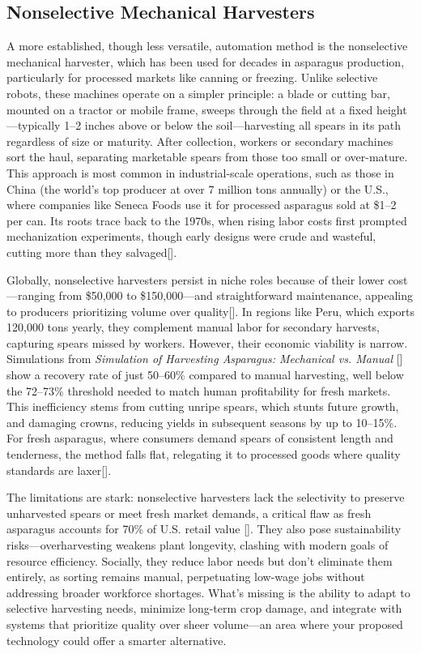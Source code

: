 \subsection{Nonselective Mechanical Harvesters}
A more established, though less versatile, automation method is the nonselective mechanical harvester, which has been used for decades in asparagus production, particularly for processed markets like canning or freezing. Unlike selective robots, these machines operate on a simpler principle: a blade or cutting bar, mounted on a tractor or mobile frame, sweeps through the field at a fixed height—typically 1--2 inches above or below the soil—harvesting all spears in its path regardless of size or maturity. After collection, workers or secondary machines sort the haul, separating marketable spears from those too small or over-mature. This approach is most common in industrial-scale operations, such as those in China (the world’s top producer at over 7 million tons annually) or the U.S., where companies like Seneca Foods use it for processed asparagus sold at \$1--2 per can. Its roots trace back to the 1970s, when rising labor costs first prompted mechanization experiments, though early designs were crude and wasteful, cutting more than they salvaged[\cite{usda2022labor}].

Globally, nonselective harvesters persist in niche roles because of their lower cost—ranging from \$50,000 to \$150,000—and straightforward maintenance, appealing to producers prioritizing volume over quality[\cite{usda2023asparagus}]. In regions like Peru, which exports 120,000 tons yearly, they complement manual labor for secondary harvests, capturing spears missed by workers. However, their economic viability is narrow. Simulations from \textit{Simulation of Harvesting Asparagus: Mechanical vs. Manual} [\cite{waea2004simulation}] show a recovery rate of just 50--60\% compared to manual harvesting, well below the 72--73\% threshold needed to match human profitability for fresh markets. This inefficiency stems from cutting unripe spears, which stunts future growth, and damaging crowns, reducing yields in subsequent seasons by up to 10--15\%. For fresh asparagus, where consumers demand spears of consistent length and tenderness, the method falls flat, relegating it to processed goods where quality standards are laxer[\cite{usda2023asparagus}].

The limitations are stark: nonselective harvesters lack the selectivity to preserve unharvested spears or meet fresh market demands, a critical flaw as fresh asparagus accounts for 70\% of U.S. retail value [\cite{usda2023asparagus}]. They also pose sustainability risks—overharvesting weakens plant longevity, clashing with modern goals of resource efficiency. Socially, they reduce labor needs but don’t eliminate them entirely, as sorting remains manual, perpetuating low-wage jobs without addressing broader workforce shortages. What’s missing is the ability to adapt to selective harvesting needs, minimize long-term crop damage, and integrate with systems that prioritize quality over sheer volume—an area where your proposed technology could offer a smarter alternative.

